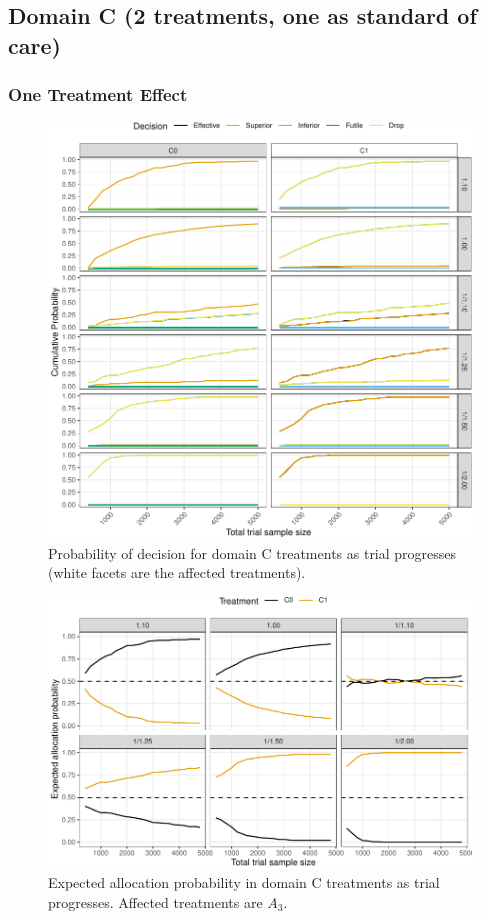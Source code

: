 \documentclass[
]{article}
\begin{document}
\clearpage

\hypertarget{domain-c-2-treatments-one-as-standard-of-care}{%
\subsection{Domain C (2 treatments, one as standard of care)}\label{domain-c-2-treatments-one-as-standard-of-care}}

\hypertarget{one-treatment-effect-2}{%
\subsubsection{One Treatment Effect}\label{one-treatment-effect-2}}

\begin{figure}
\centering
\includegraphics{ASCOT_simulations_5_files/figure-latex/unnamed-chunk-12-1.pdf}
\caption{\label{fig:unnamed-chunk-12}Probability of decision for domain C treatments as trial progresses (white facets are the affected treatments).}
\end{figure}

\begin{figure}
\centering
\includegraphics{ASCOT_simulations_5_files/figure-latex/unnamed-chunk-13-1.pdf}
\caption{\label{fig:unnamed-chunk-13}Expected allocation probability in domain C treatments as trial progresses. Affected treatments are \(A_3\).}
\end{figure}
\end{document}
